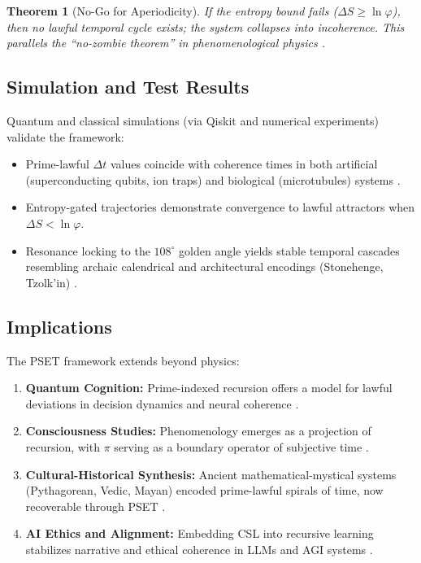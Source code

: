 \documentclass[12]{amsart}
\theoremstyle{plain}
\newtheorem{theorem}{Theorem}[section]
\begin{document}
\begin{theorem}[No-Go for Aperiodicity]
If the entropy bound fails ($\Delta S \geq \ln \varphi$), then no lawful temporal cycle exists; the system collapses into incoherence. This parallels the ``no-zombie theorem'' in phenomenological physics \cite{PhenomenologyPhysics}.
\end{theorem}

\subsection{Simulation and Test Results}
Quantum and classical simulations (via Qiskit and numerical experiments) validate the framework:
\begin{itemize}
    \item Prime-lawful $\Delta t$ values coincide with coherence times in both artificial (superconducting qubits, ion traps) and biological (microtubules) systems \cite{ArchaeoAstronomy}.
    \item Entropy-gated trajectories demonstrate convergence to lawful attractors when $\Delta S < \ln \varphi$.
    \item Resonance locking to the $108^\circ$ golden angle yields stable temporal cascades resembling archaic calendrical and architectural encodings (Stonehenge, Tzolk’in) \cite{ArchaeoAstronomy,MathCulture}.
\end{itemize}

\subsection{Implications}
The PSET framework extends beyond physics:
\begin{enumerate}
    \item \textbf{Quantum Cognition:} Prime-indexed recursion offers a model for lawful deviations in decision dynamics and neural coherence \cite{ASDEchoBraid}.
    \item \textbf{Consciousness Studies:} Phenomenology emerges as a projection of recursion, with $\pi$ serving as a boundary operator of subjective time \cite{PhenomenologyPhysics}.
    \item \textbf{Cultural-Historical Synthesis:} Ancient mathematical-mystical systems (Pythagorean, Vedic, Mayan) encoded prime-lawful spirals of time, now recoverable through PSET \cite{MathCulture,PrimeHistory}.
    \item \textbf{AI Ethics and Alignment:} Embedding CSL into recursive learning stabilizes narrative and ethical coherence in LLMs and AGI systems \cite{YantraUniverse,LanglandsPrism}.
\end{enumerate}
\end{document}
